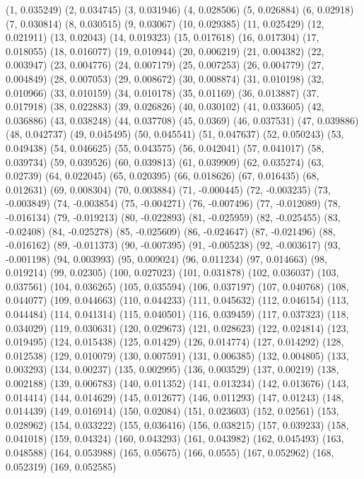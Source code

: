 (1, 0.035249)
(2, 0.034745)
(3, 0.031946)
(4, 0.028506)
(5, 0.026884)
(6, 0.02918)
(7, 0.030814)
(8, 0.030515)
(9, 0.03067)
(10, 0.029385)
(11, 0.025429)
(12, 0.021911)
(13, 0.02043)
(14, 0.019323)
(15, 0.017618)
(16, 0.017304)
(17, 0.018055)
(18, 0.016077)
(19, 0.010944)
(20, 0.006219)
(21, 0.004382)
(22, 0.003947)
(23, 0.004776)
(24, 0.007179)
(25, 0.007253)
(26, 0.004779)
(27, 0.004849)
(28, 0.007053)
(29, 0.008672)
(30, 0.008874)
(31, 0.010198)
(32, 0.010966)
(33, 0.010159)
(34, 0.010178)
(35, 0.01169)
(36, 0.013887)
(37, 0.017918)
(38, 0.022883)
(39, 0.026826)
(40, 0.030102)
(41, 0.033605)
(42, 0.036886)
(43, 0.038248)
(44, 0.037708)
(45, 0.0369)
(46, 0.037531)
(47, 0.039886)
(48, 0.042737)
(49, 0.045495)
(50, 0.045541)
(51, 0.047637)
(52, 0.050243)
(53, 0.049438)
(54, 0.046625)
(55, 0.043575)
(56, 0.042041)
(57, 0.041017)
(58, 0.039734)
(59, 0.039526)
(60, 0.039813)
(61, 0.039909)
(62, 0.035274)
(63, 0.02739)
(64, 0.022045)
(65, 0.020395)
(66, 0.018626)
(67, 0.016435)
(68, 0.012631)
(69, 0.008304)
(70, 0.003884)
(71, -0.000445)
(72, -0.003235)
(73, -0.003849)
(74, -0.003854)
(75, -0.004271)
(76, -0.007496)
(77, -0.012089)
(78, -0.016134)
(79, -0.019213)
(80, -0.022893)
(81, -0.025959)
(82, -0.025455)
(83, -0.02408)
(84, -0.025278)
(85, -0.025609)
(86, -0.024647)
(87, -0.021496)
(88, -0.016162)
(89, -0.011373)
(90, -0.007395)
(91, -0.005238)
(92, -0.003617)
(93, -0.001198)
(94, 0.003993)
(95, 0.009024)
(96, 0.011234)
(97, 0.014663)
(98, 0.019214)
(99, 0.02305)
(100, 0.027023)
(101, 0.031878)
(102, 0.036037)
(103, 0.037561)
(104, 0.036265)
(105, 0.035594)
(106, 0.037197)
(107, 0.040768)
(108, 0.044077)
(109, 0.044663)
(110, 0.044233)
(111, 0.045632)
(112, 0.046154)
(113, 0.044484)
(114, 0.041314)
(115, 0.040501)
(116, 0.039459)
(117, 0.037323)
(118, 0.034029)
(119, 0.030631)
(120, 0.029673)
(121, 0.028623)
(122, 0.024814)
(123, 0.019495)
(124, 0.015438)
(125, 0.01429)
(126, 0.014774)
(127, 0.014292)
(128, 0.012538)
(129, 0.010079)
(130, 0.007591)
(131, 0.006385)
(132, 0.004805)
(133, 0.003293)
(134, 0.00237)
(135, 0.002995)
(136, 0.003529)
(137, 0.00219)
(138, 0.002188)
(139, 0.006783)
(140, 0.011352)
(141, 0.013234)
(142, 0.013676)
(143, 0.014414)
(144, 0.014629)
(145, 0.012677)
(146, 0.011293)
(147, 0.01243)
(148, 0.014439)
(149, 0.016914)
(150, 0.02084)
(151, 0.023603)
(152, 0.02561)
(153, 0.028962)
(154, 0.033222)
(155, 0.036416)
(156, 0.038215)
(157, 0.039233)
(158, 0.041018)
(159, 0.04324)
(160, 0.043293)
(161, 0.043982)
(162, 0.045493)
(163, 0.048588)
(164, 0.053988)
(165, 0.05675)
(166, 0.0555)
(167, 0.052962)
(168, 0.052319)
(169, 0.052585)
